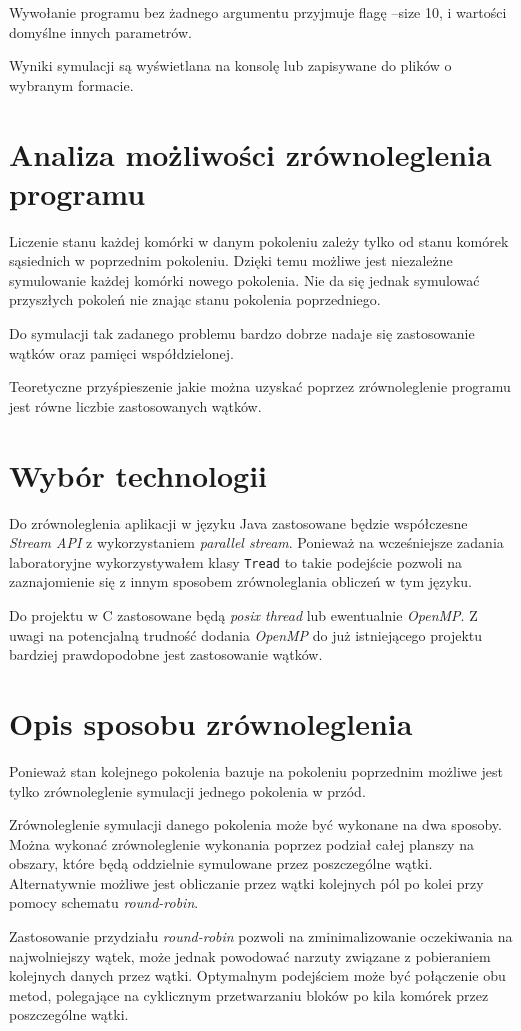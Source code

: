 \documentclass{mwart}
\begin{document}
Wywołanie programu bez żadnego argumentu przyjmuje flagę --size 10, i wartości domyślne innych parametrów.

Wyniki symulacji są wyświetlana na konsolę lub zapisywane do plików o wybranym formacie.

\section{Analiza możliwości zrównoleglenia programu}
Liczenie stanu każdej komórki w danym pokoleniu zależy tylko od stanu komórek sąsiednich w poprzednim pokoleniu. Dzięki temu możliwe jest niezależne symulowanie każdej komórki nowego pokolenia.
Nie da się jednak symulować przyszłych pokoleń nie znając stanu pokolenia poprzedniego.

Do symulacji tak zadanego problemu bardzo dobrze nadaje się zastosowanie wątków oraz pamięci współdzielonej.

Teoretyczne przyśpieszenie jakie można uzyskać poprzez zrównoleglenie programu jest równe liczbie zastosowanych wątków.

\section{Wybór technologii}
Do zrównoleglenia aplikacji w języku Java zastosowane będzie współczesne \textit{Stream API} z wykorzystaniem \textit{parallel stream}. Ponieważ na wcześniejsze zadania laboratoryjne wykorzystywałem klasy \texttt{Tread} to takie podejście pozwoli na zaznajomienie się z innym sposobem zrównoleglania obliczeń w tym języku.

Do projektu w C zastosowane będą \textit{posix thread} lub ewentualnie \textit{OpenMP}.
Z uwagi na potencjalną trudność dodania \textit{OpenMP} do już istniejącego projektu bardziej prawdopodobne jest zastosowanie wątków.

\section{Opis sposobu zrównoleglenia}
Ponieważ stan kolejnego pokolenia bazuje na pokoleniu poprzednim możliwe jest tylko zrównoleglenie symulacji jednego pokolenia w przód.

Zrównoleglenie symulacji danego pokolenia może być wykonane na dwa sposoby.
Można wykonać zrównoleglenie wykonania poprzez podział całej planszy na obszary, które będą oddzielnie symulowane przez poszczególne wątki.
Alternatywnie możliwe jest obliczanie przez wątki kolejnych pól po kolei przy pomocy schematu \textit{round-robin}.

Zastosowanie przydziału \textit{round-robin} pozwoli na zminimalizowanie oczekiwania na najwolniejszy wątek, może jednak powodować narzuty związane z pobieraniem kolejnych danych przez wątki.
Optymalnym podejściem może być połączenie obu metod, polegające na cyklicznym przetwarzaniu bloków po kila komórek przez poszczególne wątki.
\end{document}

